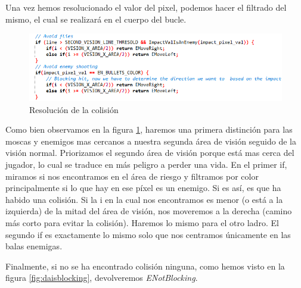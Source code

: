 Una vez hemos resolucionado el valor del pixel, podemos hacer el filtrado del mismo, el cual se realizará en el cuerpo del bucle.

\begin{figure}[h]
	\centering
	\includegraphics[width=1\textwidth]{Figures/cuerpobucleisblockingda}
	\caption{Resolución de la colisión}
	\label{fig:cuerpobucleisblockingda}
\end{figure}

Como bien observamos en la figura 	\ref{fig:cuerpobucleisblockingda}, haremos una primera distinción para las moscas y enemigos mas cercanos a nuestra segunda área de visión seguido de la visión normal. Priorizamos el segundo área de visión porque está mas cerca del jugador, lo cual se traduce en más peligro a perder una vida. En el primer if, miramos si nos encontramos en el área de riesgo y filtramos por color principalmente si lo que hay en ese píxel es un enemigo. Si es así, es que ha habido una colisión. Si la i en la cual nos encontramos es menor (o está a la izquierda) de la mitad del área de visión, nos moveremos a la derecha (camino más corto para evitar la colisión). Haremos lo mismo para el otro ladro. El segundo if es exactamente lo mismo solo que nos centramos únicamente en las balas enemigas.

Finalmente, si no se ha encontrado colisión ninguna, como hemos visto en la figura \ref{fig:daisblocking}, devolveremos \textit{ENotBlocking}.

